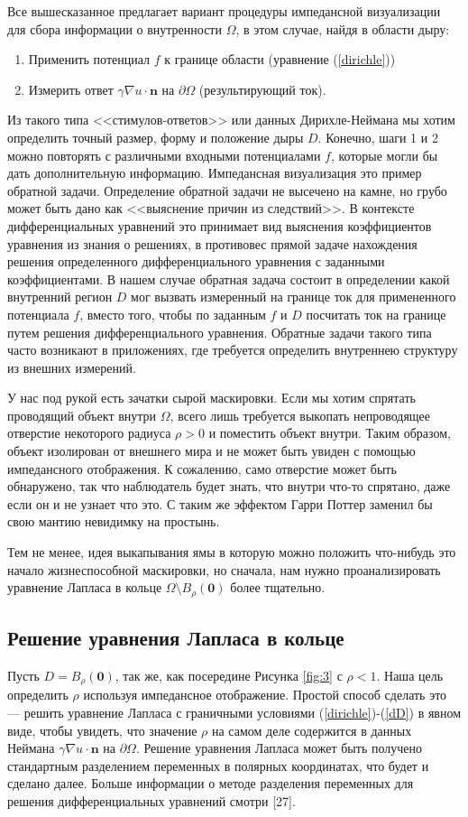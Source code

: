 \documentclass[a4paper, 12pt]{article}
\begin{document}
Все вышесказанное предлагает вариант процедуры импедансной визуализации для сбора информации о внутренности $\Omega$, в этом случае, найдя в области дыру:
\begin{enumerate}
  \item Применить потенциал $f$ к границе области (уравнение (\ref{dirichle}))
  \item Измерить ответ $\gamma \nabla u \cdot \textbf{n}$ на $\partial \Omega$ (результирующий ток).
\end{enumerate}
Из такого типа <<стимулов-ответов>> или данных Дирихле-Неймана мы хотим определить точный размер, форму и положение дыры $D$. Конечно, шаги 1 и 2 можно повторять с различными входными потенциалами $f$, которые могли бы дать дополнительную информацию. Импедансная визуализация это пример обратной задачи. Определение обратной задачи не высечено на камне, но грубо может быть дано как <<выяснение причин из следствий>>. В контексте дифференциальных уравнений это принимает вид выяснения коэффициентов уравнения из знания о решениях, в противовес прямой задаче нахождения решения определенного дифференциального уравнения с заданными коэффициентами. В нашем случае обратная задача состоит в определении какой внутренний регион $D$ мог вызвать измеренный на границе ток для примененного потенциала $f$, вместо того, чтобы по заданным $f$ и $D$ посчитать ток на границе путем решения дифференциального уравнения. Обратные задачи такого типа часто возникают в приложениях, где требуется определить внутреннею структуру из внешних измерений.


У нас под рукой есть зачатки сырой маскировки. Если мы хотим спрятать проводящий объект внутри $\Omega$, всего лишь требуется выкопать непроводящее отверстие некоторого радиуса $\rho > 0$ и поместить объект внутри. Таким образом, объект изолирован от внешнего мира и не может быть увиден с помощью импедансного отображения. К сожалению, само отверстие может быть обнаружено, так что наблюдатель будет знать, что внутри что-то спрятано, даже если он и не узнает что это. С таким же эффектом Гарри Поттер заменил бы свою мантию невидимку на простынь.


Тем не менее, идея выкапывания ямы в которую можно положить что-нибудь это начало жизнеспособной маскировки, но сначала, нам нужно проанализировать уравнение Лапласа в кольце $\Omega \setminus B_{\rho}(\textbf{0})$ более тщательно.

\subsection{Решение уравнения Лапласа в кольце}
Пусть $D = B_{\rho}(\textbf{0})$, так же, как посередине Рисунка \ref{fig:3} с $\rho < 1$. Наша цель определить $\rho$ используя импедансное отображение. Простой способ сделать это --- решить уравнение Лапласа с граничными условиями (\ref{dirichle})-(\ref{dD}) в явном виде, чтобы увидеть, что значение $\rho$ на самом деле содержится в данных Неймана $\gamma \nabla u \cdot \textbf{n}$ на $\partial \Omega$. Решение уравнения Лапласа может быть получено стандартным разделением переменных в полярных координатах, что будет и сделано далее. Больше информации о методе разделения переменных для решения дифференциальных уравнений смотри [27].
\end{document}
